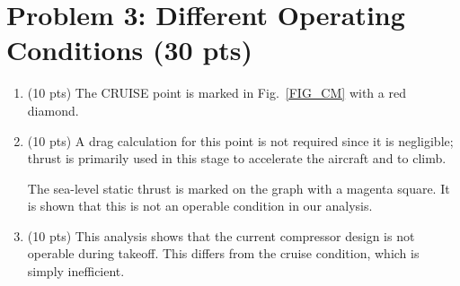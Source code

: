 \documentclass[12pt]{article}
\begin{document}
\section{Problem 3: Different Operating Conditions (30 pts)}		
\begin{enumerate}[label=(\alph*)]
	\item (10 pts)
		The CRUISE point is marked in Fig.~\ref{FIG_CM} with a red diamond.
	\item (10 pts)
		A drag calculation for this point is not required since it is negligible; thrust is primarily used in this stage to accelerate the aircraft and to climb. 
		
		The sea-level static thrust is marked on the graph with a magenta square. It is shown that this is not an operable condition in our analysis.
	\item (10 pts)
		This analysis shows that the current compressor design is not operable during takeoff. This differs from the cruise condition, which is simply inefficient.
\end{enumerate}
\end{document}
